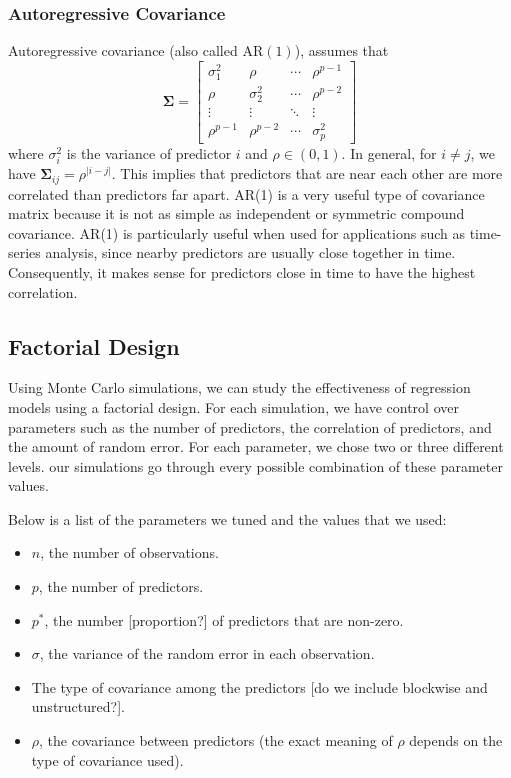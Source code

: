 \documentclass{article}
\begin{document}
\subsubsection{Autoregressive Covariance}
Autoregressive covariance (also called $\text{AR}(1)$), assumes that
\begin{equation}
	\mathbf{\Sigma} = \begin{bmatrix}
		\sigma_1^2 & \rho & \cdots & \rho^{p - 1}\\
		\rho & \sigma_2^2 & \cdots & \rho^{p - 2}\\
		\vdots & \vdots & \ddots & \vdots\\
		\rho^{p - 1} & \rho^{p - 2} & \cdots & \sigma_p^2
	\end{bmatrix}
\end{equation}
where $\sigma_i^2$ is the variance of predictor $i$ and $\rho \in (0, 1)$. In general, for $i\neq j$, we have $\mathbf{\Sigma}_{ij} = \rho^{\vert i - j\vert}$. This implies that predictors that are near each other are more correlated than predictors far apart. AR(1) is a very useful type of covariance matrix because it is not as simple as independent or symmetric compound covariance. AR(1) is particularly useful when used for applications such as time-series analysis, since nearby predictors are usually close together in time. Consequently, it makes sense for predictors close in time to have the highest correlation.

\subsection{Factorial Design}
Using Monte Carlo simulations, we can study the effectiveness of regression models using a factorial design. For each simulation, we have control over parameters such as the number of predictors, the correlation of predictors, and the amount of random error. For each parameter, we chose two or three different levels. our simulations  go through every possible combination of these parameter values.

Below is a list of the parameters we tuned and the values that we used:
\begin{itemize}
	\item $n$, the number of observations.
	\item $p$, the number of predictors.
	\item $p^\ast$, the number [proportion?] of predictors that are non-zero.
	\item $\sigma$, the variance of the random error in each observation.
	\item The type of covariance among the predictors [do we include blockwise and unstructured?].
	\item $\rho$, the covariance between predictors (the exact meaning of $\rho$ depends on the type of covariance used).
\end{itemize}
\end{document}

